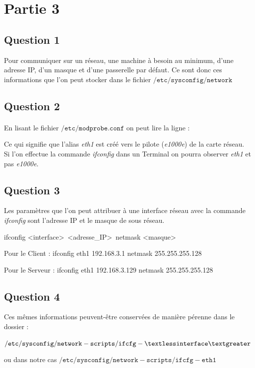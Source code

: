 \documentclass[12pt,a4paper,notitlepage]{article}
\begin{document}
\section{Partie 3}
\subsection{Question 1}
Pour communiquer sur un réseau, une machine à besoin au minimum, d'une adresse IP, d'un masque et d'une passerelle par défaut. Ce sont donc ces informations que l'on peut stocker dans le fichier $\mathtt{/etc/sysconfig/network}$

\subsection{Question 2}
\paragraph{}En lisant le fichier $\mathtt{/etc/modprobe.conf}$ on peut lire la ligne :

\begin{center}
 \end{center}

Ce qui signifie que l'alias \textit{eth1} est créé vers le pilote (\textit{e1000e}) de la carte réseau. Si l'on effectue la commande \textit{ifconfig} dans un Terminal on pourra observer \textit{eth1} et pas \textit{e1000e}.

\subsection{Question 3}

Les paramètres que l'on peut attribuer à une interface réseau avec la commande \textit{ifconfig} sont l'adresse IP et le masque de sous réseau.

ifconfig \textless interface\textgreater\  \textless adresse\_IP\textgreater\ netmask \textless masque\textgreater

Pour le Client :
ifconfig eth1 192.168.3.1 netmask 255.255.255.128


Pour le Serveur :
ifconfig eth1 192.168.3.129 netmask 255.255.255.128 


\subsection{Question 4}

Ces mêmes informations peuvent-être conservées de manière pérenne dans le dossier :

$\mathtt{/etc/sysconfig/network-scripts/ifcfg-\textless interface\textgreater}$ 

ou dans notre cas $\mathtt{/etc/sysconfig/network-scripts/ifcfg-eth1}$ 
\end{document}
